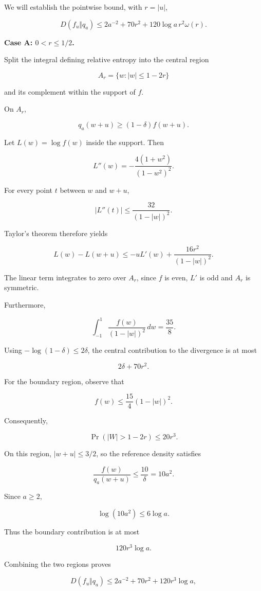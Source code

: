 \documentclass[11pt]{article}
\begin{document}
We will establish the pointwise bound, with \(r=|u|\),

\[
D(f_u\Vert q_a)
\leq
2a^{-2}+70r^2+
120\log a\,r^2\omega(r).
\tag{1}
\]

\textbf{Case A: \(0<r\leq1/2\).}

Split the integral defining relative entropy into the central region

\[
A_r=\{w:|w|\leq1-2r\}
\]

and its complement within the support of \(f\).

On \(A_r\),

\[
q_a(w+u)\geq(1-\delta)f(w+u).
\]

Let \(L(w)=\log f(w)\) inside the support. Then

\[
L''(w)=-\frac{4(1+w^2)}{(1-w^2)^2}.
\]

For every point \(t\) between \(w\) and \(w+u\),

\[
|L''(t)|\leq
\frac{32}{(1-|w|)^2}.
\]

Taylor's theorem therefore yields

\[
L(w)-L(w+u)
\leq-uL'(w)+
\frac{16r^2}{(1-|w|)^2}.
\]

The linear term integrates to zero over \(A_r\), since \(f\) is even, \(L'\) is odd and \(A_r\) is symmetric.

Furthermore,

\[
\int_{-1}^{1}
\frac{f(w)}{(1-|w|)^2}\,dw
=\frac{35}{8}.
\]

Using \(-\log(1-\delta)\leq2\delta\), the central contribution to the divergence is at most

\[
2\delta+70r^2.
\]

For the boundary region, observe that

\[
f(w)\leq\frac{15}{4}(1-|w|)^2.
\]

Consequently,

\[
\Pr(|W|>1-2r)\leq20r^3.
\]

On this region, \(|w+u|\leq3/2\), so the reference density satisfies

\[
\frac{f(w)}{q_a(w+u)}
\leq\frac{10}{\delta}=10a^2.
\]

Since \(a\geq2\),

\[
\log(10a^2)\leq6\log a.
\]

Thus the boundary contribution is at most

\[
120r^3\log a.
\]

Combining the two regions proves

\[
D(f_u\Vert q_a)
\leq2a^{-2}+70r^2+120r^3\log a,
\]
\end{document}
